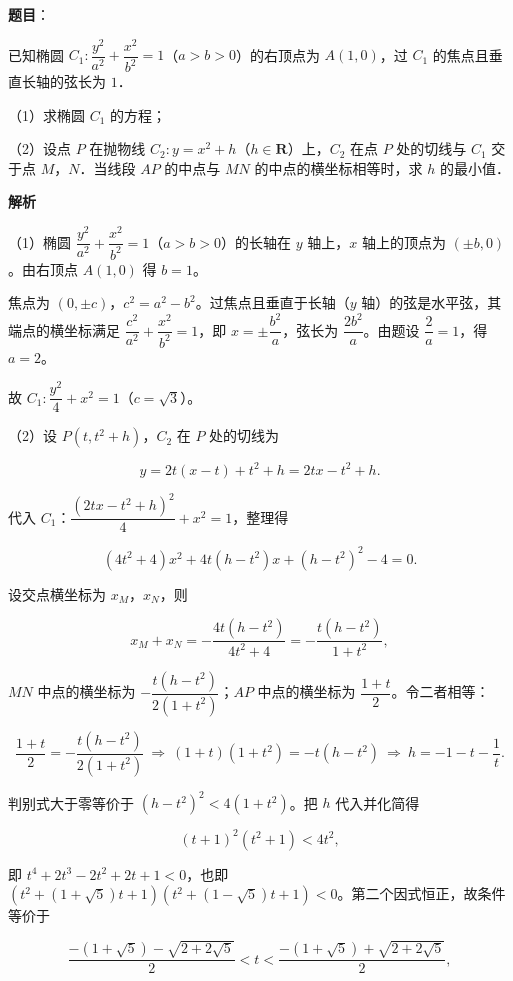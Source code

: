 \begin{answer}

\textbf{题目}：

已知椭圆 $C_1:\dfrac{y^2}{a^2}+\dfrac{x^2}{b^2}=1$（$a>b>0$）的右顶点为 $A(1,0)$，过 $C_1$ 的焦点且垂直长轴的弦长为 $1$．

（1）求椭圆 $C_1$ 的方程；

（2）设点 $P$ 在抛物线 $C_2:y=x^2+h$（$h\in\mathbf R$）上，$C_2$ 在点 $P$ 处的切线与 $C_1$ 交于点 $M$，$N$．当线段 $AP$ 的中点与 $MN$ 的中点的横坐标相等时，求 $h$ 的最小值．

\textbf{解析}

（1）椭圆 $\dfrac{y^2}{a^2}+\dfrac{x^2}{b^2}=1$（$a>b>0$）的长轴在 $y$ 轴上，$x$ 轴上的顶点为 $(\pm b,0)$。由右顶点 $A(1,0)$ 得 $b=1$。

焦点为 $(0,\pm c)$，$c^2=a^2-b^2$。过焦点且垂直于长轴（$y$ 轴）的弦是水平弦，其端点的横坐标满足 $\dfrac{c^2}{a^2}+\dfrac{x^2}{b^2}=1$，即 $x=\pm\dfrac{b^2}{a}$，弦长为 $\dfrac{2b^2}{a}$。由题设 $\dfrac{2}{a}=1$，得 $a=2$。

故 $C_1:\dfrac{y^2}{4}+x^2=1$（$c=\sqrt3$）。

（2）设 $P(t,t^2+h)$，$C_2$ 在 $P$ 处的切线为

\nopagebreak[4]
\[y=2t(x-t)+t^2+h=2tx-t^2+h.\]

代入 $C_1$：$\dfrac{(2tx-t^2+h)^2}{4}+x^2=1$，整理得

\nopagebreak[4]
\[(4t^2+4)x^2+4t(h-t^2)x+(h-t^2)^2-4=0.\]

设交点横坐标为 $x_M$，$x_N$，则

\nopagebreak[4]
\[x_M+x_N=-\frac{4t(h-t^2)}{4t^2+4}=-\frac{t(h-t^2)}{1+t^2},\]

$MN$ 中点的横坐标为 $-\dfrac{t(h-t^2)}{2(1+t^2)}$；$AP$ 中点的横坐标为 $\dfrac{1+t}{2}$。令二者相等：

\nopagebreak[4]
\[\frac{1+t}{2}=-\frac{t(h-t^2)}{2(1+t^2)}\ \Longrightarrow\ (1+t)(1+t^2)=-t(h-t^2)\ \Longrightarrow\ h=-1-t-\frac1t.\]

判别式大于零等价于 $(h-t^2)^2<4(1+t^2)$。把 $h$ 代入并化简得

\nopagebreak[4]
\[(t+1)^2(t^2+1)<4t^2,\]

即 $t^4+2t^3-2t^2+2t+1<0$，也即 $(t^2+(1+\sqrt5)t+1)(t^2+(1-\sqrt5)t+1)<0$。第二个因式恒正，故条件等价于

\nopagebreak[4]
\[\frac{-(1+\sqrt5)-\sqrt{2+2\sqrt5}}{2}<t<\frac{-(1+\sqrt5)+\sqrt{2+2\sqrt5}}{2},\]


\end{answer}
